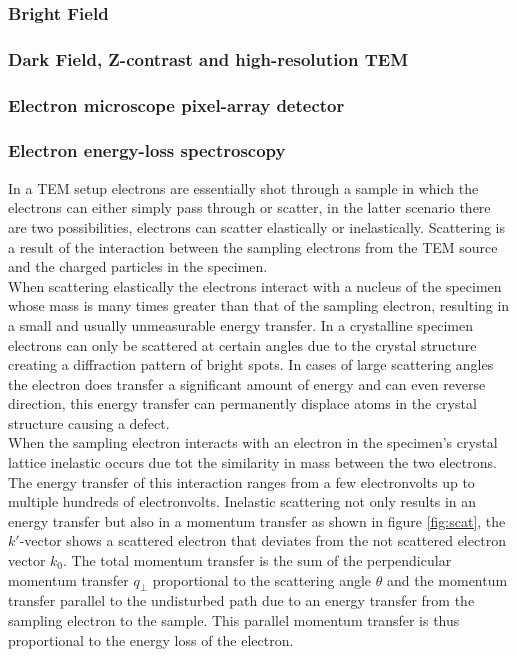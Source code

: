 \subsubsection{Bright Field}
\subsubsection{Dark Field, Z-contrast and high-resolution TEM}
\subsubsection{Electron microscope pixel-array detector}
\subsubsection{Electron energy-loss spectroscopy}
In a TEM setup electrons are essentially shot through a sample in which the electrons can either simply pass through or scatter, in the latter scenario there are two possibilities, electrons can scatter elastically or inelastically.
Scattering is a result of the interaction between the sampling electrons from the TEM source and the charged particles in the specimen.\\
When scattering elastically the electrons interact with a nucleus of the specimen whose mass is many times greater than that of the sampling electron, resulting in a small and usually unmeasurable energy transfer.
In a crystalline specimen electrons can only be scattered at certain angles due to the crystal structure creating a diffraction pattern of bright spots. In cases of large scattering angles the electron does transfer a significant amount of energy and can even reverse direction, this energy transfer can permanently displace atoms in the crystal structure causing a defect.\cite{Egerton_2008}\\
When the sampling electron interacts with an electron in the specimen's crystal lattice inelastic occurs due tot the similarity in mass between the two electrons. The energy transfer of this interaction ranges from a few electronvolts up to multiple hundreds of electronvolts.
Inelastic scattering not only results in an energy transfer but also in a momentum transfer as shown in figure \ref{fig:scat}, the $k'$-vector shows a scattered electron that deviates from the not scattered electron vector $k_0$.
The total momentum transfer is the sum of the perpendicular momentum transfer $q_{\perp}$ proportional to the scattering angle $\theta$ and the momentum transfer parallel to the undisturbed path due to an energy transfer from the sampling electron to the sample. This parallel momentum transfer is thus proportional to the energy loss of the electron.
